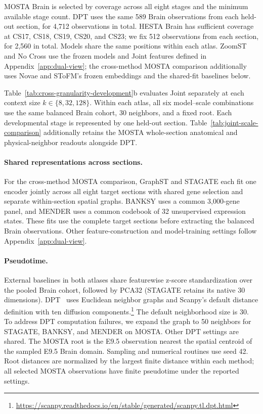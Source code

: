 MOSTA Brain is selected by coverage across all eight stages and the minimum available stage count. DPT uses the same 589 Brain observations from each held-out section, for 4,712 observations in total. HESTA Brain has sufficient coverage at CS17, CS18, CS19, CS20, and CS23; we fix 512 observations from each section, for 2,560 in total. Models share the same positions within each atlas. ZoomST and No Cross use the frozen models and Joint features defined in Appendix~\ref{app:dual-view}; the cross-method MOSTA comparison additionally uses Novae and SToFM's frozen embeddings and the shared-fit baselines below.

Table~\ref{tab:cross-granularity-development}b evaluates Joint separately at each context size $k\in\{8,32,128\}$. Within each atlas, all six model--scale combinations use the same balanced Brain cohort, 30 neighbors, and a fixed root. Each developmental stage is represented by one held-out section. Table~\ref{tab:joint-scale-comparison} additionally retains the MOSTA whole-section anatomical and physical-neighbor readouts alongside DPT.

\paragraph{Shared representations across sections.}
For the cross-method MOSTA comparison, GraphST and STAGATE each fit one encoder jointly across all eight target sections with shared gene selection and separate within-section spatial graphs. BANKSY uses a common 3,000-gene panel, and MENDER uses a common codebook of 32 unsupervised expression states. These fits use the complete target sections before extracting the balanced Brain observations. Other feature-construction and model-training settings follow Appendix~\ref{app:dual-view}.

\paragraph{Pseudotime.}
External baselines in both atlases share featurewise z-score standardization over the pooled Brain cohort, followed by PCA32 (STAGATE retains its native 30 dimensions). DPT~\citep{haghverdi2016dpt} uses Euclidean neighbor graphs and Scanpy's default distance definition with ten diffusion components.\footnote{\url{https://scanpy.readthedocs.io/en/stable/generated/scanpy.tl.dpt.html}} The default neighborhood size is 30. To address DPT computation failures, we expand the graph to 50 neighbors for STAGATE, BANKSY, and MENDER on MOSTA. Other DPT settings are shared. The MOSTA root is the E9.5 observation nearest the spatial centroid of the sampled E9.5 Brain domain. Sampling and numerical routines use seed 42. Root distances are normalized by the largest finite distance within each method; all selected MOSTA observations have finite pseudotime under the reported settings.

